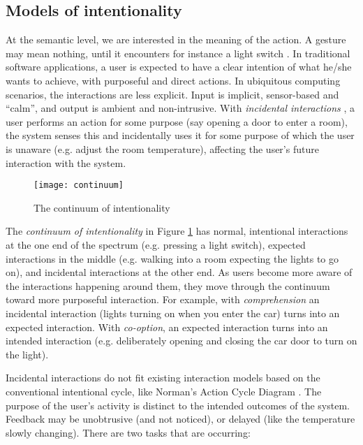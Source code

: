 	
\subsection{Models of intentionality}
\label{intentionalSpectrum}
	
	At the semantic level, we are interested in the meaning of the action. A gesture may mean nothing, until it encounters for instance a light switch \cite{Bongers2007}. In traditional software applications, a user is expected to have a clear intention of what he/she wants to achieve, with purposeful and direct actions. In ubiquitous computing scenarios, the interactions are less explicit. Input is implicit, sensor-based and ``calm'', and output is ambient and non-intrusive. With \emph{incidental interactions} \cite{Dix2004}, a user performs an action for some purpose (say opening a door to enter a room), the system senses this and incidentally uses it for some purpose of which the user is unaware (e.g. adjust the room temperature), affecting the user's future interaction with the system.
	
\begin{figure}
	\centering
	\centerline{\texttt{[image: continuum]}}
	\caption{The continuum of intentionality}
	\label{continuum}
\end{figure}	

	The \emph{continuum of intentionality} in Figure \ref{continuum} has normal, intentional interactions at the one end of the spectrum (e.g. pressing a light switch), expected interactions in the middle (e.g. walking into a room expecting the lights to go on), and incidental interactions at the other end. As users become more aware of the interactions happening around them, they move through the continuum toward more purposeful interaction. For example, with \emph{comprehension} an incidental interaction (lights turning on when you enter the car) turns into an expected interaction. With \emph{co-option}, an expected interaction turns into an intended interaction (e.g. deliberately opening and closing the car door to turn on the light).

	Incidental interactions do not fit existing interaction models based on the conventional intentional cycle, like Norman's Action Cycle Diagram \cite{Norman1998}. The purpose of the user's activity is distinct to the intended outcomes of the system. Feedback may be unobtrusive (and not noticed), or delayed (like the temperature slowly changing). There are two tasks that are occurring:


